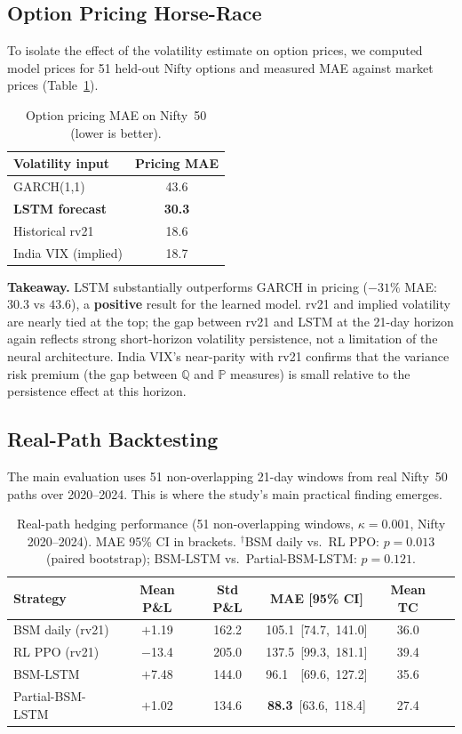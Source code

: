 \documentclass[10pt,a4paper]{article}
\begin{document}
\subsection*{Option Pricing Horse-Race}
To isolate the effect of the volatility estimate on option prices, we
computed model prices for 51 held-out Nifty options and measured MAE
against market prices (Table~\ref{tab:pricing}).

\begin{table}[H]
\centering
\caption{Option pricing MAE on Nifty~50 (lower is better).}
\label{tab:pricing}
\begin{tabular}{lc}
\toprule
Volatility input & Pricing MAE \\
\midrule
GARCH(1,1)             & 43.6 \\
\textbf{LSTM forecast} & \textbf{30.3} \\
Historical rv21        & 18.6 \\
India VIX (implied)    & 18.7 \\
\bottomrule
\end{tabular}
\end{table}

\textbf{Takeaway.} LSTM substantially outperforms GARCH in pricing
($-31\%$ MAE: $30.3$ vs $43.6$), a \textbf{positive} result for the
learned model.  rv21 and implied volatility are nearly tied at the top;
the gap between rv21 and LSTM at the 21-day horizon again reflects strong
short-horizon volatility persistence, not a limitation of the neural
architecture.  India VIX's near-parity with rv21 confirms that the
variance risk premium (the gap between $\mathbb{Q}$ and $\mathbb{P}$
measures) is small relative to the persistence effect at this horizon.

\subsection*{Real-Path Backtesting}
The main evaluation uses 51 non-overlapping 21-day windows from real
Nifty~50 paths over 2020--2024. This is where the study’s main practical
finding emerges.

\begin{table}[H]
\centering
\caption{Real-path hedging performance (51 non-overlapping windows,
         $\kappa=0.001$, Nifty 2020--2024).
         MAE 95\% CI in brackets.
         $^\dagger$BSM daily vs.\ RL PPO: $p=0.013$ (paired bootstrap);
         BSM-LSTM vs.\ Partial-BSM-LSTM: $p=0.121$.}
\label{tab:real}
\begin{tabular}{lccccc}
\toprule
Strategy & Mean P\&L & Std P\&L & MAE [95\% CI] & Mean TC \\
\midrule
BSM daily (rv21)  & $+$1.19  & 162.2 & 105.1\ [74.7,\ 141.0] & 36.0 \\
RL PPO (rv21)     & $-$13.4  & 205.0 & 137.5\ [99.3,\ 181.1] & 39.4 \\
BSM-LSTM          & $+$7.48  & 144.0 & 96.1\ \ [69.6,\ 127.2] & 35.6 \\
Partial-BSM-LSTM  & $+$1.02  & 134.6 & \textbf{88.3}\ [63.6,\ 118.4] & 27.4 \\
\bottomrule
\end{tabular}
\end{table}
\end{document}
